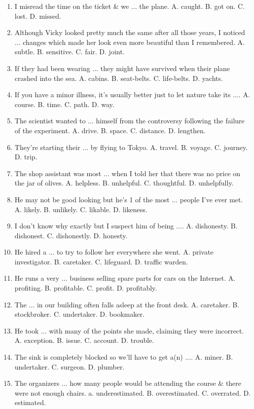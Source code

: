 \documentclass{article}
\numberwithin{equation}{section}
\begin{document}
\begin{enumerate}[leftmargin=5mm]
	\item I misread the time on the ticket \& we $\ldots$ the plane. A. caught. B. got on. C. lost. D. missed.
	\item Although Vicky looked pretty much the same after all those years, I noticed $\ldots$ changes which made her look even more beautiful than I remembered. A. subtle. B. sensitive. C. fair. D. joint.
	\item If they had been wearing $\ldots$ they might have survived when their plane crashed into the sea. A. cabins. B. seat-belts. C. life-belts. D. yachts.
	\item If you have a minor illness, it's usually better just to let nature take its $\ldots$. A. course. B. time. C. path. D. way.
	\item The scientist wanted to $\ldots$ himself from the controversy following the failure of the experiment. A. drive. B. space. C. distance. D. lengthen.
	\item They're starting their $\ldots$ by flying to Tokyo. A. travel. B. voyage. C. journey. D. trip.
	\item The shop assistant was most $\ldots$ when I told her that there was no price on the jar of olives. A. helpless. B. unhelpful. C. thoughtful. D. unhelpfully.
	\item He may not be good looking but he's 1 of the most $\ldots$ people I've ever met. A. likely. B. unlikely. C. likable. D. likeness.
	\item I don't know why exactly but I suspect him of being $\ldots$. A. dishonesty. B. dishonest. C. dishonestly. D. honesty.
	\item He hired a $\ldots$ to try to follow her everywhere she went. A. private investigator. B. caretaker. C. lifeguard. D. traffic warden.
	\item He runs a very $\ldots$ business selling spare parts for cars on the Internet. A. profiting. B. profitable. C. profit. D. profitably.
	\item The $\ldots$ in our building often falls asleep at the front desk. A. caretaker. B. stockbroker. C. undertaker. D. bookmaker.
	\item He took $\ldots$ with many of the points she made, claiming they were incorrect. A. exception. B. issue. C. account. D. trouble.
	\item The sink is completely blocked so we'll have to get a(n) $\ldots$. A. miner. B. undertaker. C. surgeon. D. plumber.
	\item The organizers $\ldots$ how many people would be attending the course \& there were not enough chairs. a. underestimated. B. overestimated. C. overrated. D. estimated.

\end{enumerate}
\end{document}
